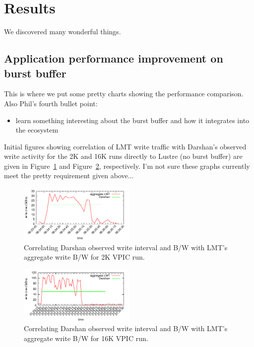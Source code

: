 \documentclass[conference,10pt,compsocconf]{IEEEtran}
\begin{document}
\section{Results}

We discovered many wonderful things.

\subsection{Application performance improvement on burst buffer}

This is where we put some pretty charts showing the performance comparison.
Also Phil's fourth bullet point:

\begin{itemize}
\item learn something interesting about the burst buffer and how it integrates
into the ecosystem
\end{itemize}

Initial figures showing correlation of LMT write traffic with Darshan's observed
write activity for the 2K and 16K runs directly to Lustre (no burst buffer) are
given in Figure~\ref{fig:2k-write} and Figure~\ref{fig:16k-write}, respectively.
I'm not sure these graphs currently meet the pretty requirement given above...

\begin{figure}
\centering
\includegraphics[width=0.5\textwidth]{figs/2k-lustre-wr-bw.pdf}
\caption{Correlating Darshan observed write interval and B/W with LMT's aggregate
write B/W for 2K VPIC run.}
\label{fig:2k-write}
\end{figure}

\begin{figure}
\centering
\includegraphics[width=0.5\textwidth]{figs/16k-lustre-wr-bw.pdf}
\caption{Correlating Darshan observed write interval and B/W with LMT's aggregate
write B/W for 16K VPIC run.}
\label{fig:16k-write}
\end{figure}
\end{document}
